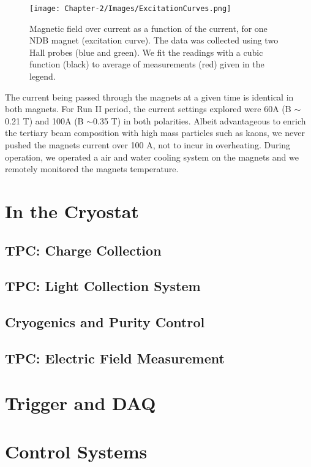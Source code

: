 \begin{figure}[!h]
\begin{centering}
\vspace{-0.3cm}
\texttt{[image: Chapter-2/Images/ExcitationCurves.png]}
\caption{
{ Magnetic field over current as a function of the current, for one NDB magnet (excitation curve). The data was collected using two Hall probes (blue and green). We fit the readings with a cubic function (black) to average of measurements (red) given in the legend.}
}
\label{fig:magnet_excitation}
\end{centering}
\end{figure}

The current being passed through the magnets at a given time is identical in both magnets. For Run II period, the current settings explored were 60A (B $\sim$0.21 T) and 100A (B $\sim$0.35 T) in both polarities. 
Albeit advantageous to enrich the tertiary beam composition with high mass particles such as kaons, we never pushed the magnets current over 100 A, not to incur in overheating.  During operation, we operated a air and water cooling system on the magnets and we remotely monitored the magnets temperature.
 





\section{In the Cryostat}

\subsection{TPC: Charge Collection}\label{sec:TPC}
\subsection{TPC: Light Collection System}
\subsection{Cryogenics and Purity Control}
\subsection{TPC: Electric Field Measurement}
\section{Trigger and DAQ}
\section{Control Systems}

